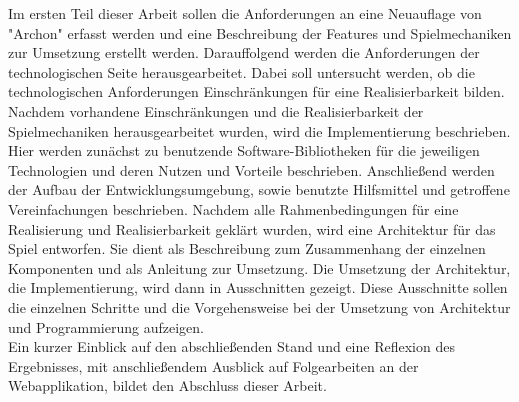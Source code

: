 Im ersten Teil dieser Arbeit sollen die Anforderungen an eine Neuauflage von "Archon" erfasst werden und eine Beschreibung der Features und Spielmechaniken zur Umsetzung erstellt werden.
Darauffolgend werden die Anforderungen der technologischen Seite herausgearbeitet. Dabei soll untersucht werden, ob die technologischen Anforderungen Einschränkungen für eine Realisierbarkeit bilden.\\
Nachdem \ggf vorhandene Einschränkungen und die Realisierbarkeit der Spielmechaniken herausgearbeitet wurden, wird die Implementierung beschrieben. Hier werden zunächst zu benutzende Software-Bibliotheken für die jeweiligen Technologien und deren Nutzen und Vorteile beschrieben.
Anschließend werden der Aufbau der Entwicklungsumgebung, sowie benutzte Hilfsmittel und getroffene Vereinfachungen beschrieben.
Nachdem alle Rahmenbedingungen für eine Realisierung und Realisierbarkeit geklärt wurden, wird eine Architektur für das Spiel entworfen. Sie dient als Beschreibung zum Zusammenhang der einzelnen Komponenten und als Anleitung zur Umsetzung.
Die Umsetzung der Architektur, die Implementierung, wird dann in Ausschnitten gezeigt. Diese Ausschnitte sollen die einzelnen Schritte und die Vorgehensweise bei der Umsetzung von Architektur und Programmierung aufzeigen.\\
Ein kurzer Einblick auf den abschließenden Stand und eine Reflexion des Ergebnisses, mit anschließendem Ausblick auf Folgearbeiten an der Webapplikation, bildet den Abschluss dieser Arbeit.